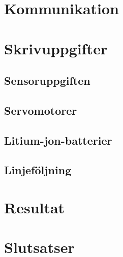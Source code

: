 \documentclass[a4paper,12pt]{article}
\begin{document}
\section{Kommunikation}

\section{Skrivuppgifter}

\subsection{Sensoruppgiften}
\subsection{Servomotorer}
\subsection{Litium-jon-batterier}
\subsection{Linjeföljning}
\section{Resultat}
\section{Slutsatser}
\end{document}
